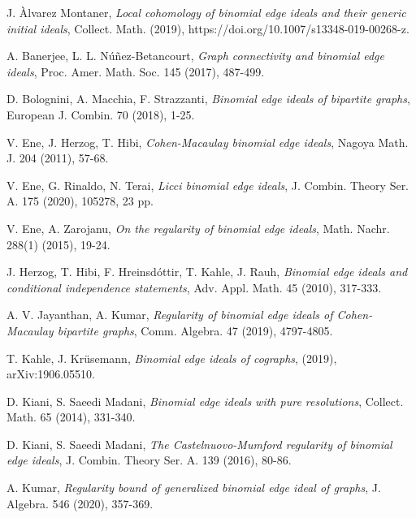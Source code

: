 \documentclass[12pt]{amsart}
\begin{document}
	
	\begin{thebibliography}{99}


		
 J. \`Alvarez Montaner, {\em Local cohomology of binomial edge ideals and their generic initial ideals}, Collect. Math.  (2019),  https://doi.org/10.1007/s13348-019-00268-z.

 A. Banerjee, L. L. N\'u\~nez-Betancourt, {\em  Graph connectivity and binomial edge ideals}, 
Proc. Amer. Math. Soc. 145 (2017), 487-499.
			
 D. Bolognini, A. Macchia, F. Strazzanti, {\em Binomial edge ideals of bipartite graphs}, 
European J. Combin. 70 (2018), 1-25.			
			
 V. Ene, J. Herzog, T. Hibi, {\em Cohen-Macaulay binomial edge ideals}, Nagoya Math. J. 204 (2011), 57-68.
	
 V. Ene, G. Rinaldo, N. Terai, {\em Licci binomial edge ideals}, J. Combin. Theory Ser. A. 175 (2020), 105278, 23 pp.

 V. Ene, A. Zarojanu, {\em On the regularity of binomial edge ideals}, Math. Nachr. 288(1) (2015), 19-24.
		
		
			
 J. Herzog, T. Hibi, F. Hreinsd{\'o}ttir, T. Kahle, J. Rauh, {\em Binomial edge ideals and conditional independence statements}, Adv. Appl. Math. 45 (2010), 317-333.
		

		



 A. V. Jayanthan, A. Kumar, {\em Regularity of binomial edge ideals of Cohen-Macaulay bipartite graphs}, Comm. Algebra. 47 (2019), 4797-4805.
		

 T. Kahle, J. Kr{\"u}semann, {\em Binomial edge ideals of cographs}, (2019), arXiv:1906.05510.


 D. Kiani, S. Saeedi Madani, {\em Binomial edge ideals with pure resolutions}, Collect. Math. 65 (2014), 331-340.


 D. Kiani, S. Saeedi Madani, {\em The Castelnuovo-Mumford regularity of binomial edge ideals}, J. Combin. Theory Ser. A. 139 (2016), 80-86.


 A. Kumar, {\em Regularity bound of generalized binomial edge ideal of graphs}, J. Algebra. 546 (2020), 357-369.


\end{thebibliography}
\end{document}
